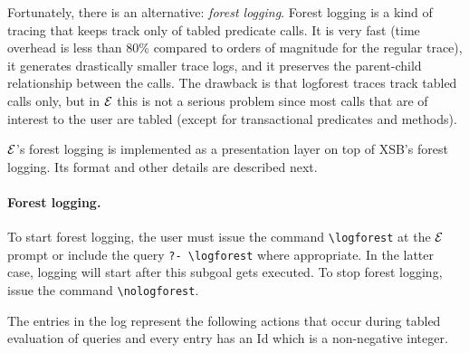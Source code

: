 \documentclass[11pt]{article}
\newcommand{\ERGO}{\mbox{\ensuremath{\cal{E}}\smaller{{\sc{RGO}}}}\xspace}
\newcommand{\FLSYSTEM}{\ERGO}
\newcommand{\bs}{\textbackslash}
\begin{document}
Fortunately, there is an alternative: \emph{forest logging}.
Forest logging is a kind of tracing that keeps track only of tabled
predicate calls. It is very fast (time overhead is less than 80\% compared
to orders of magnitude for the regular trace), it generates
drastically smaller trace logs, and it preserves the parent-child
relationship between the calls. The drawback is that logforest
traces track tabled calls
only, but in \FLSYSTEM this is not a serious problem since most calls that
are of interest to the user are
tabled (except for transactional predicates and methods).

\FLSYSTEM's forest logging is 
implemented as a presentation layer on top of XSB's forest logging.
Its format and other details are described next.

\paragraph{Forest logging.}
To start forest logging, the user
must issue the command {\tt \bs{}logforest} at the \FLSYSTEM
prompt or include the query {\tt ?- \bs{}logforest} where appropriate.
In the latter case, logging will start after this subgoal gets executed. 
To stop forest logging, issue the command {\tt \bs{}nologforest}. 

The entries in the log represent the following actions that occur during
tabled evaluation of queries and every entry has an Id which is a
non-negative integer. 
\end{document}
